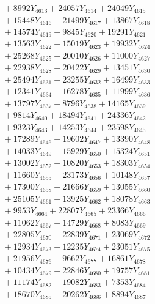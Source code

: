 \documentclass[a4paper,10pt]{article}
\begin{document}
{\begin{align}
&\;  + 8992 Y_{4613} + 24057 Y_{4614} + 24049 Y_{4615} \\[0.3ex]
&\;  + 15448 Y_{4616} + 21499 Y_{4617} + 13867 Y_{4618} \\[0.5ex]\allowbreak
&\;  + 14574 Y_{4619} + 9845 Y_{4620} + 19291 Y_{4621} \\[0.3ex]
&\;  + 13563 Y_{4622} + 15019 Y_{4623} + 19932 Y_{4624} \\[0.3ex]
&\;  + 25268 Y_{4625} + 20010 Y_{4626} + 11000 Y_{4627} \\[0.3ex]
&\;  + 22938 Y_{4628} + 20422 Y_{4629} + 13451 Y_{4630} \\[0.3ex]
&\;  + 25494 Y_{4631} + 23255 Y_{4632} + 16499 Y_{4633} \\[0.3ex]
&\;  + 12341 Y_{4634} + 16278 Y_{4635} + 11999 Y_{4636} \\[0.3ex]
&\;  + 13797 Y_{4637} + 8796 Y_{4638} + 14165 Y_{4639} \\[0.3ex]
&\;  + 9814 Y_{4640} + 18494 Y_{4641} + 24336 Y_{4642} \\[0.3ex]
&\;  + 9323 Y_{4643} + 14253 Y_{4644} + 23598 Y_{4645} \\[0.3ex]
&\;  + 17289 Y_{4646} + 19602 Y_{4647} + 13390 Y_{4648} \\[0.5ex]\allowbreak
&\;  + 14033 Y_{4649} + 15929 Y_{4650} + 15324 Y_{4651} \\[0.3ex]
&\;  + 13002 Y_{4652} + 10820 Y_{4653} + 18303 Y_{4654} \\[0.3ex]
&\;  + 11660 Y_{4655} + 23173 Y_{4656} + 10148 Y_{4657} \\[0.3ex]
&\;  + 17300 Y_{4658} + 21666 Y_{4659} + 13055 Y_{4660} \\[0.3ex]
&\;  + 25105 Y_{4661} + 13925 Y_{4662} + 18078 Y_{4663} \\[0.3ex]
&\;  + 9953 Y_{4664} + 22807 Y_{4665} + 23366 Y_{4666} \\[0.3ex]
&\;  + 11062 Y_{4667} + 14729 Y_{4668} + 8083 Y_{4669} \\[0.3ex]
&\;  + 22805 Y_{4670} + 22839 Y_{4671} + 23069 Y_{4672} \\[0.3ex]
&\;  + 12934 Y_{4673} + 12235 Y_{4674} + 23051 Y_{4675} \\[0.3ex]
&\;  + 21956 Y_{4676} + 9662 Y_{4677} + 16861 Y_{4678} \\[0.5ex]\allowbreak
&\;  + 10434 Y_{4679} + 22846 Y_{4680} + 19757 Y_{4681} \\[0.3ex]
&\;  + 11174 Y_{4682} + 19082 Y_{4683} + 7353 Y_{4684} \\[0.3ex]
&\;  + 18670 Y_{4685} + 20262 Y_{4686} + 8894 Y_{4687} \\[0.3ex]

\end{align}}
\end{document}
